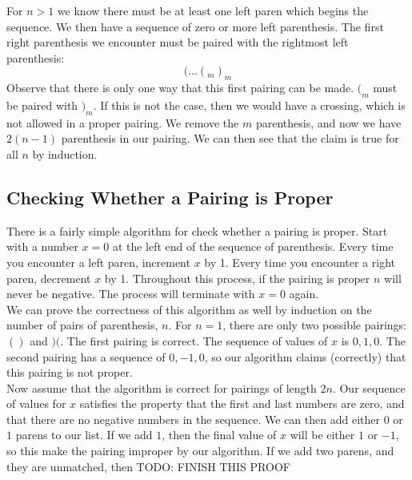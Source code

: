 For $n > 1$ we know there must be at least one left paren which begins the sequence. We then have a sequence of zero or more left parenthesis. The first right parenthesis we encounter must be paired with the rightmost left parenthesis:
\begin{equation*}
  (...(_m)_m
\end{equation*}
Observe that there is only one way that this first pairing can be made. $(_m$ must be paired with $)_m$. If this is not the case, then we would have a crossing, which is not allowed in a proper pairing. We remove the $m$ parenthesis, and now we have $2(n-1)$ parenthesis in our pairing. We can then see that the claim is true for all $n$ by induction.\\

\subsection{Checking Whether a Pairing is Proper}
There is a fairly simple algorithm for check whether a pairing is proper. Start with a number $x = 0$ at the left end of the sequence of parenthesis. Every time you encounter a left paren, increment $x$ by 1. Every time you encounter a right paren, decrement $x$ by 1. Throughout this process, if the pairing is proper $n$ will never be negative. The process will terminate with $x = 0$ again.\\

We can prove the correctness of this algorithm as well by induction on the number of pairs of parenthesis, $n$. For $n = 1$, there are only two possible pairings: $()$ and $)($. The first pairing is correct. The sequence of values of $x$ is $0,1,0$. The second pairing has a sequence of $0,-1,0$, so our algorithm claims (correctly) that this pairing is not proper.\\

Now assume that the algorithm is correct for pairings of length $2n$. Our sequence of values for $x$ satisfies the property that the first and last numbers are zero, and that there are no negative numbers in the sequence. We can then add either $0$ or $1$ parens to our list. If we add $1$, then the final value of $x$ will be either $1$ or $-1$, so this make the pairing improper by our algorithm. If we add two parens, and they are unmatched, then TODO: FINISH THIS PROOF